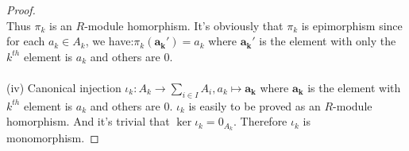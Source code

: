 \documentclass[a4paper]{article}
\begin{document}
\begin{proof}
$$        $$
        Thus $\pi_k$ is an $R$-module homorphism. It's obviously that $\pi_k$ is epimorphism since for each $a_k\in A_k$, we have:$\pi_k(\mathbf{a_k'})=a_k$ where $\mathbf{a_k'}$ is the element with only the $k^{th}$ element is $a_k$ and others are 0.\\
        \vspace{0.2cm}\\
        (iv) Canonical injection $\iota_k:A_k\rightarrow \sum_{i\in I}A_i,a_k\mapsto \mathbf{a_k}$ where $\mathbf{a_k}$ is the element with $k^{th}$ element is $a_k$ and others are 0. $\iota_k$ is easily to be proved as an $R$-module 
        homorphism. And it's trivial that $\ker \iota_k={0_{A_k}}$. Therefore $\iota_k$ is monomorphism.
    \end{proof}
    
\end{document}
